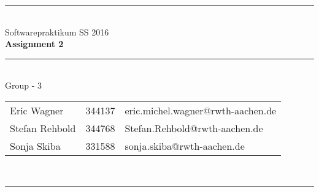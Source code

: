 \documentclass[a4paper,12pt]{article}
\begin{document}
\begin{center}
	\rule{\textwidth}{0.1pt}\\[1cm]
	
	\Large Softwarepraktikum SS 2016\\\bf Assignment 2
\end{center}


\begin{center}

	\rule{\textwidth}{0.1pt}\\[0.5cm]

	{\Large Group - 3\\[5mm]} 

	\begin{tabular}{lll}
		
		Eric Wagner & 344137 & eric.michel.wagner@rwth-aachen.de \\

		Stefan Rehbold & 344768 & Stefan.Rehbold@rwth-aachen.de \\

		Sonja Skiba & 331588 & sonja.skiba@rwth-aachen.de \\

	\end{tabular}\\[0.5cm]

	\rule{\textwidth}{0.1pt}\\[1cm]

\end{center}





\end{document}
